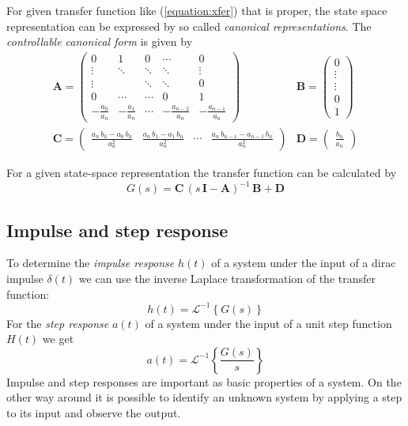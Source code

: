 \documentclass[a4paper,12pt]{article}
\newcommand{\Mat}[1]{\mathbf{#1}}
\newcommand{\SubSection}[2]{\subsection{#2}\label{subsection:#1}}
\newcommand{\ERef}[1]{(\ref{equation:#1})}
\begin{document}
For given transfer function like \ERef{xfer} that is proper, the state space
representation can be expressed by so called {\em canonical representations}.
The {\em controllable canonical form} is given by
\begin{equation}
\begin{array}{ll}
\Mat{A}=\left(\begin{array}{ccccc}
0 & 1 & 0 & \cdots & 0\\
\vdots & \ddots & \ddots & \ddots & \vdots\\
\vdots & & \ddots & \ddots & 0\\
0 & \cdots & \cdots & 0 & 1\\
-\frac{a_0}{a_n} & -\frac{a_1}{a_n} & \cdots & -\frac{a_{n-2}}{a_n} & -\frac{a_{n-1}}{a_n}
\end{array}\right)
&
\Mat{B}=\left(\begin{array}{c}
0\\
\vdots\\
\vdots\\
0\\
1
\end{array}\right)\\
\Mat{C}=\left(\begin{array}{ccccc}
\frac{a_n\,b_0-a_0\,b_n}{a_n^2} & \frac{a_n\,b_1-a_1\,b_n}{a_n^2} & \cdots & \frac{a_n\,b_{n-1}-a_{n-1}\,b_n}{a_n^2}
\end{array}\right)
&
\Mat{D}=\left(\begin{array}{c}
\frac{b_n}{a_n}
\end{array}\right)
\end{array}
\end{equation}

For a given state-space representation the transfer function can be calculated
by
\begin{equation}
G(s)=\Mat{C}\,\left(s\,\Mat{I}-\Mat{A}\right)^{-1}\,\Mat{B}+\Mat{D}
\end{equation}

\SubSection{pulsestep}{Impulse and step response}

To determine the {\em impulse response} $h(t)$ of a system under the input of a
dirac impulse $\delta(t)$ we can use the inverse Laplace transformation of the
transfer function:
\begin{equation}
h(t)=\mathcal{L}^{-1}\left\{G(s)\right\}
\end{equation}
For the {\em step response} $a(t)$ of a system under the input of a unit step
function $H(t)$ we get
\begin{equation}
a(t)=\mathcal{L}^{-1}\left\{\frac{G(s)}{s}\right\}
\end{equation}
Impulse and step responses are important as basic properties of a system. On
the other way around it is possible to identify an unknown system by applying
a step to its input and observe the output.
\end{document}
